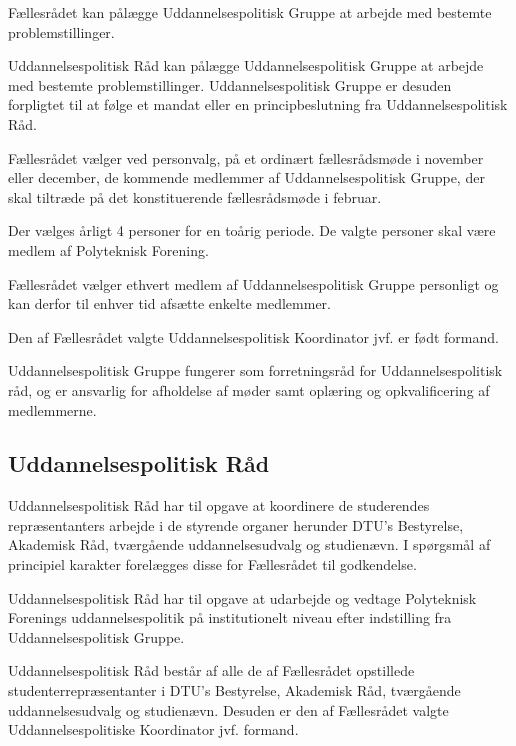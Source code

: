 \begin{list}
 Fællesrådet kan pålægge Uddannelsespolitisk Gruppe at arbejde med bestemte problemstillinger.

 Uddannelsespolitisk Råd kan pålægge Uddannelsespolitisk Gruppe at arbejde med bestemte problemstillinger. Uddannelsespolitisk Gruppe er desuden forpligtet til at følge et mandat eller en principbeslutning fra Uddannelsespolitisk Råd.

\item Fællesrådet vælger ved personvalg, på et ordinært fællesrådsmøde i november eller december, de kommende medlemmer af Uddannelsespolitisk Gruppe, der skal tiltræde på det konstituerende fællesrådsmøde i februar.

 Der vælges årligt 4 personer for en toårig periode. De valgte personer skal være medlem af Polyteknisk Forening.

 Fællesrådet vælger ethvert medlem af Uddannelsespolitisk Gruppe personligt og kan derfor til enhver tid afsætte enkelte medlemmer.

 Den af Fællesrådet valgte Uddannelsespolitisk Koordinator jvf.  er født formand.

\item Uddannelsespolitisk Gruppe fungerer som forretningsråd for Uddannelsespolitisk råd, og er ansvarlig for afholdelse af møder samt oplæring og opkvalificering af medlemmerne.



\subsection{Uddannelsespolitisk Råd}
\label{L:kap:upr}
\item Uddannelsespolitisk Råd har til opgave at koordinere de studerendes repræsentanters arbejde i de styrende organer herunder DTU’s Bestyrelse, Akademisk Råd, tværgående uddannelsesudvalg og studienævn. I spørgsmål af principiel karakter forelægges disse for Fællesrådet til godkendelse.

 Uddannelsespolitisk Råd har til opgave at udarbejde og vedtage Polyteknisk Forenings
uddannelsespolitik på institutionelt niveau efter indstilling fra Uddannelsespolitisk Gruppe.

\item Uddannelsespolitisk Råd består af alle de af Fællesrådet opstillede studenterrepræsentanter i DTU’s Bestyrelse, Akademisk Råd, tværgående uddannelsesudvalg og studienævn. Desuden er den af Fællesrådet valgte Uddannelsespolitiske Koordinator jvf.  formand.



\end{list}
